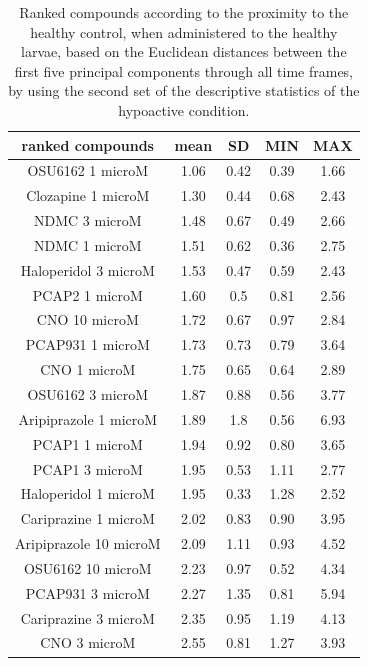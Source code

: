 \documentclass[a4paper,12pt]{article}
\begin{document}
\begin{table}[h!]\tiny
\centering
\caption{Ranked compounds according to the proximity to the healthy control, when administered to the healthy larvae, based on the Euclidean distances between the first five principal components through all time frames, by using the second set of the descriptive statistics of the hypoactive condition.}
\begin{tabular}{|c|c|c|c|c|}
\hline
ranked compounds             & mean & SD   & MIN  & MAX   \\ \hline
OSU6162 1 microM       & 1.06 & 0.42 & 0.39 & 1.66  \\ \hline
Clozapine 1 microM     & 1.30  & 0.44 & 0.68 & 2.43  \\ \hline
NDMC 3 microM          & 1.48 & 0.67 & 0.49 & 2.66  \\ \hline
NDMC 1 microM          & 1.51 & 0.62 & 0.36 & 2.75  \\ \hline
Haloperidol 3 microM   & 1.53 & 0.47 & 0.59 & 2.43  \\ \hline
PCAP2 1 microM         & 1.60  & 0.5  & 0.81 & 2.56  \\ \hline
CNO 10 microM          & 1.72 & 0.67 & 0.97 & 2.84  \\ \hline
PCAP931 1 microM       & 1.73 & 0.73 & 0.79 & 3.64  \\ \hline
CNO 1 microM           & 1.75 & 0.65 & 0.64 & 2.89  \\ \hline
OSU6162 3 microM       & 1.87 & 0.88 & 0.56 & 3.77  \\ \hline
Aripiprazole 1 microM  & 1.89 & 1.8  & 0.56 & 6.93  \\ \hline
PCAP1 1 microM         & 1.94 & 0.92 & 0.80  & 3.65  \\ \hline
PCAP1 3 microM         & 1.95 & 0.53 & 1.11 & 2.77  \\ \hline
Haloperidol 1 microM   & 1.95 & 0.33 & 1.28 & 2.52  \\ \hline
Cariprazine 1 microM   & 2.02 & 0.83 & 0.90  & 3.95  \\ \hline
Aripiprazole 10 microM & 2.09 & 1.11 & 0.93 & 4.52  \\ \hline
OSU6162 10 microM      & 2.23 & 0.97 & 0.52 & 4.34  \\ \hline
PCAP931 3 microM       & 2.27 & 1.35 & 0.81 & 5.94  \\ \hline
Cariprazine 3 microM   & 2.35 & 0.95 & 1.19 & 4.13  \\ \hline
CNO 3 microM           & 2.55 & 0.81 & 1.27 & 3.93  \\ \hline

\end{tabular}
\end{table}
\end{document}
